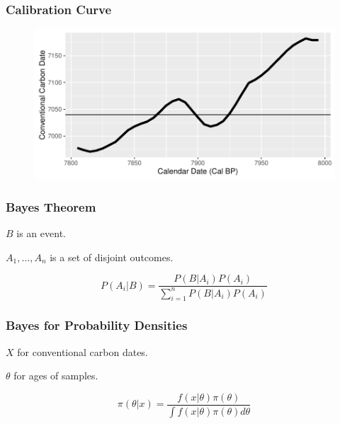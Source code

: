 \documentclass{beamer} %
\begin{document}
\begin{frame}
	\frametitle{Calibration Curve}
	\begin{figure}
	\includegraphics[width=\textwidth]{partcal}
	\end{figure}

\end{frame}


\begin{frame}
	
	\frametitle{Bayes Theorem}
	
	$B$ is an event.
	\hfill \break
	
	$A_1, \dotso, A_n$ is a set of disjoint outcomes.
	
	\[
	P(A_i|B) = \frac{P(B|A_i) P(A_i)}{\sum_{i=1}^n P(B|A_i)P(A_i)} 
	\]	

\end{frame}


\begin{frame}

	\frametitle{Bayes for Probability Densities}
	
	$X$ for conventional carbon dates.
	\hfill \break

	
	$\theta$ for ages of samples.
	
	\[  
	\pi(\theta|x) = \frac{f(x|\theta)\pi(\theta)}{\int f(x|\theta)\pi(\theta) d\theta }
	 \]


\end{frame}

\end{document}
